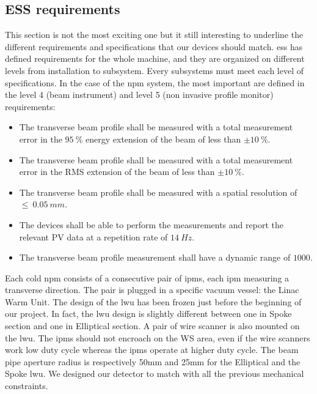 \begin{refsection}
	\section{ESS requirements}
	This section is not the most exciting one but it still interesting to underline the different requirements and specifications that our devices should match. \acrshort{ess} has defined requirements for the whole machine, and they are organized on different levels from installation to subsystem. Every subsystems must meet each level of specifications. In the case of the \acrshort{npm} system, the most important are defined in the level 4 (beam instrument) and level 5 (non invasive profile monitor) requirements:
	\begin{itemize}
		\item The transverse beam profile shall be measured with a total measurement error in the $95\ \%$ energy extension of the beam of less than $\pm10\ \%$.
		\item The transverse beam profile shall be measured with a total measurement error in the RMS extension of the beam of less than $\pm10\ \%$.
		\item The transverse beam profile shall be measured with a spatial resolution of $\leq\ 0.05\ mm$.
		\item The devices shall be able to perform the measurements and report the relevant PV data at a repetition rate of $14\ Hz$.
		\item The transverse beam profile measurement shall have a dynamic range of $1000$.
	\end{itemize}

	Each cold \acrshort{npm} consists of a consecutive pair of \acrshort{ipm}s, each \acrshort{ipm} measuring a transverse direction. The pair is plugged in a specific vacuum vessel: the Linac Warm Unit. The design of the \acrshort{lwu} has been frozen just before the beginning of our project. In fact, the \acrshort{lwu} design is slightly different between one in Spoke section and one in Elliptical section. A pair of wire scanner is also mounted on the \acrshort{lwu}. The \acrshort{ipm}s should not encroach on the WS area, even if the wire scanners work low duty cycle whereas the \acrshort{ipm}s operate at higher duty cycle. The beam pipe aperture radius is respectively 50mm and 25mm for the Elliptical and the Spoke \acrshort{lwu}. We designed our detector to match with all the previous mechanical constraints.


\end{refsection}
